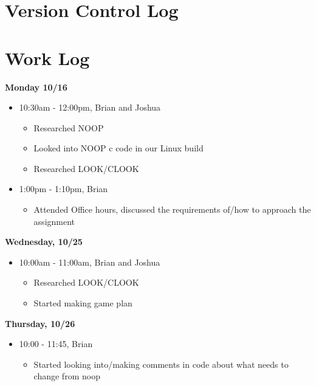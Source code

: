 \documentclass[letterpaper, onecolumn, draftclsnofoot, 10pt, compsoc]{IEEEtran}
\begin{document}
\section{Version Control Log}
    
    
\section{Work Log}
    \begin{singlespace}
        \textbf{Monday 10/16}
            \begin{itemize}
                \item 10:30am - 12:00pm, Brian and Joshua
                \begin{itemize}
                    \item Researched NOOP
                    \item Looked into NOOP c code in our Linux build
                    \item Researched LOOK/CLOOK
                \end{itemize}
                \item 1:00pm - 1:10pm, Brian
                    \begin{itemize}
                        \item Attended Office hours, discussed the requirements of/how to approach the assignment
                    \end{itemize}
            \end{itemize}
        \textbf{Wednesday, 10/25}
            \begin{itemize}
                \item 10:00am - 11:00am, Brian and Joshua
                \begin{itemize}
                    \item Researched LOOK/CLOOK
                    \item Started making game plan
                \end{itemize}
            \end{itemize}
        \textbf{Thursday, 10/26}
            \begin{itemize}
                \item 10:00 - 11:45, Brian
                \begin{itemize}
                    \item Started looking into/making comments in code about what needs to change from noop
                \end{itemize}

\end{itemize}
\end{singlespace}
\end{document}
